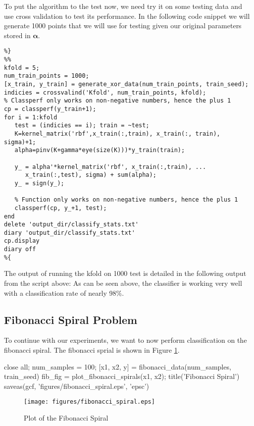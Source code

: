 \documentclass[11pt, twoside]{article}   	%
\newenvironment{matlab}{\comment}{\endcomment}
\begin{document}
To put the algorithm to the test now, we need try it on some testing data
and use cross validation to test its performance. In the following code
snippet we will generate 1000 points that we will use for testing given our
original parameters stored in $\bm{\alpha}$.

\begin{lstlisting}
%}
%%
kfold = 5; 
num_train_points = 1000; 
[x_train, y_train] = generate_xor_data(num_train_points, train_seed);
indicies = crossvalind('Kfold', num_train_points, kfold); 
% Classperf only works on non-negative numbers, hence the plus 1
cp = classperf(y_train+1);
for i = 1:kfold
   test = (indicies == i); train = ~test;
   K=kernel_matrix('rbf',x_train(:,train), x_train(:, train), sigma)+1; 
   alpha=pinv(K+gamma*eye(size(K)))*y_train(train);
   
   y_ = alpha'*kernel_matrix('rbf', x_train(:,train), ...
      x_train(:,test), sigma) + sum(alpha); 
   y_ = sign(y_);
   
   % Function only works on non-negative numbers, hence the plus 1
   classperf(cp, y_+1, test);
end
delete 'output_dir/classify_stats.txt'
diary 'output_dir/classify_stats.txt'
cp.display
diary off
%{
\end{lstlisting}

The output of running the kfold on 1000 test is detailed in the following
output from the script above: 
\color{lightgray}
\color{black}
As can be seen above, the classifier is working very well with a classification rate of nearly 98\%. 

\subsection{Fibonacci Spiral Problem}
To continue with our experiments, we want to now perform classification on
the fibonacci spiral. The fibonacci sprial is shown in Figure \ref{fig:fibonacci_spiral}. 

\begin{matlab}
close all;
num_samples = 100; 
[x1, x2, y] = fibonacci_data(num_samples, train_seed)
fib_fig = plot_fibonacci_spirals(x1, x2); 
title('Fibonacci Spiral')
saveas(gcf, 'figures/fibonacci_spiral.eps', 'epsc')
\end{matlab}

\begin{figure}[h]
\centering
\texttt{[image: figures/fibonacci\_spiral.eps]}
\caption{Plot of the Fibonacci Spiral}
\label{fig:fibonacci_spiral} 
\end{figure}
\end{document}
